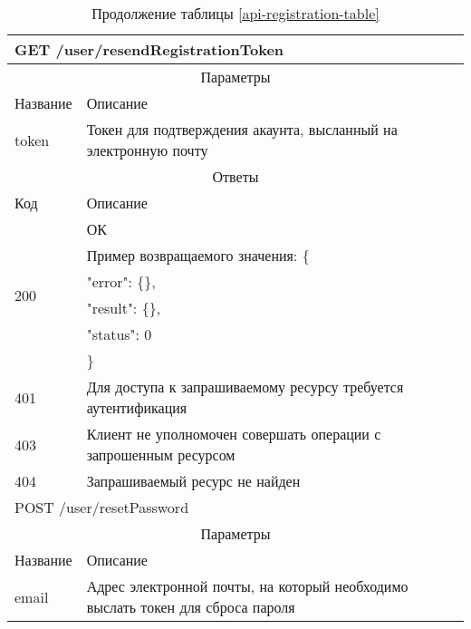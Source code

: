 \begin{table}[H]
  \caption*{Продолжение таблицы \ref{api-registration-table}}
  \begin{tabular}{|p{6cm}|p{10cm}|}
  \hline \multicolumn{2}{|l|}{GET /user/resendRegistrationToken} \\
  \hline \multicolumn{2}{|c|}{Параметры} \\
  \hline Название & Описание \\
  \hline token & Токен для подтверждения акаунта, высланный на электронную почту \\
  \hline \multicolumn{2}{|c|}{Ответы} \\
  \hline Код & Описание \\
  \hline \multirow{6}{=}{200} & ОК \\
   & Пример возвращаемого значения: \{ \\
   & "error": \{\}, \\
   & "result": \{\}, \\
   & "status": 0 \\
   & \} \\
  \hline 401 & Для доступа к запрашиваемому ресурсу требуется аутентификация \\
  \hline 403 & Клиент не уполномочен совершать операции с запрошенным ресурсом \\
  \hline 404 & Запрашиваемый ресурс не найден \\
  \hline \multicolumn{2}{|l|}{POST /user/resetPassword} \\
  \hline \multicolumn{2}{|c|}{Параметры} \\
  \hline Название & Описание \\
  \hline email & Адрес электронной почты, на который необходимо выслать токен для сброса пароля \\
  \hline
  \end{tabular}
\end{table}
